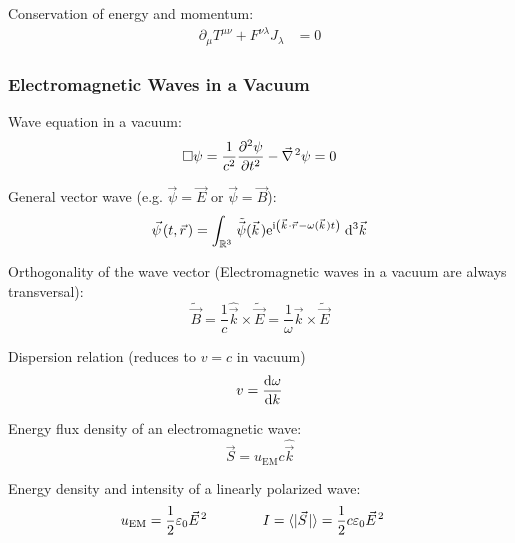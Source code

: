 			\noindent
			Conservation of energy and momentum:
			\begin{equation}
				\begin{aligned}
					\partial_\mu T^{\mu\nu} + F^{\nu\lambda} J_\lambda &= 0
				\end{aligned}
			\end{equation}


		\subsubsection{Electromagnetic Waves in a Vacuum}
			\noindent
			Wave equation in a vacuum:
			\begin{equation}
				\Box\psi = \frac{1}{c^2} \frac{\partial^2 \psi}{\partial t^2} - \Nabla^2 \psi = 0
			\end{equation}

			\noindent
			General vector wave (e.g. $\vec{\psi}=\vec{E}$ or $ \vec{\psi}=\vec{B}$):
			\begin{equation}
				\vec{\psi}(t,\vec{r}) = \int_{\mathbb{R}^3} \tilde{\vec{\psi}} (\vec{k}) \ex^{\i\left(\vec{k}\cdot\vec{r} - \omega(\vec{k})t \right)}\;\dd^3\vec{k}
			\end{equation}

			\noindent
			Orthogonality of the wave vector (Electromagnetic waves in a vacuum are always transversal):
			\begin{equation}
				\tilde{\vec{B}} = \frac{1}{c}\hat{\vec{k}}\times\tilde{\vec{E}} = \frac{1}{\omega}\vec{k}\times\tilde{\vec{E}}
			\end{equation}

			\noindent
			Dispersion relation (reduces to $v=c$ in vacuum)
			\begin{equation}
				v = \dv{\omega}{k}
			\end{equation}

			\noindent
			Energy flux density of an electromagnetic wave:
			\begin{equation}
				\vec{S} = u_{\text{EM}}c\hat{\vec{k}}
			\end{equation}

			\noindent
			Energy density and intensity of a linearly polarized wave:
			\begin{equation}
				\begin{aligned}
					u_{\text{EM}} &= \frac{1}{2}\varepsilon_0\vec{E}^2 &\hsp
					I &= \langle|\vec{S}|\rangle = \frac{1}{2}c\varepsilon_0\vec{E}^2
				\end{aligned}
			\end{equation}

